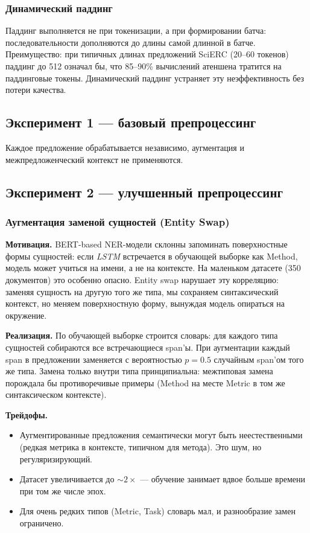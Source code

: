 \subsubsection{Динамический паддинг}

Паддинг выполняется не при токенизации, а при формировании батча: последовательности дополняются до длины самой длинной в батче. Преимущество: при типичных длинах предложений SciERC (20--60 токенов) паддинг до 512 означал бы, что 85--90\% вычислений атеншена тратится на паддинговые токены. Динамический паддинг устраняет эту неэффективность без потери качества.

\subsection{Эксперимент 1 --- базовый препроцессинг}

Каждое предложение обрабатывается независимо, аугментация и межпредложенческий контекст не применяются.

\subsection{Эксперимент 2 --- улучшенный препроцессинг}

\subsubsection{Аугментация заменой сущностей (Entity Swap)}

\textbf{Мотивация.} BERT-based NER-модели склонны запоминать поверхностные формы сущностей: если \textit{LSTM} встречается в обучающей выборке как Method, модель может учиться на имени, а не на контексте. На маленьком датасете (350 документов) это особенно опасно. Entity swap нарушает эту корреляцию: заменяя сущность на другую того же типа, мы сохраняем синтаксический контекст, но меняем поверхностную форму, вынуждая модель опираться на окружение.

\textbf{Реализация.} По обучающей выборке строится словарь: для каждого типа сущностей собираются все встречающиеся span'ы. При аугментации каждый span в предложении заменяется с вероятностью $p = 0.5$ случайным span'ом того же типа. Замена только внутри типа принципиальна: межтиповая замена порождала бы противоречивые примеры (Method на месте Metric в том же синтаксическом контексте).

\textbf{Трейдофы.}
\begin{itemize}
    \item Аугментированные предложения семантически могут быть неестественными (редкая метрика в контексте, типичном для метода). Это шум, но регуляризирующий.
    \item Датасет увеличивается до $\sim 2 \times$ --- обучение занимает вдвое больше времени при том же числе эпох.
    \item Для очень редких типов (Metric, Task) словарь мал, и разнообразие замен ограничено.
\end{itemize}

